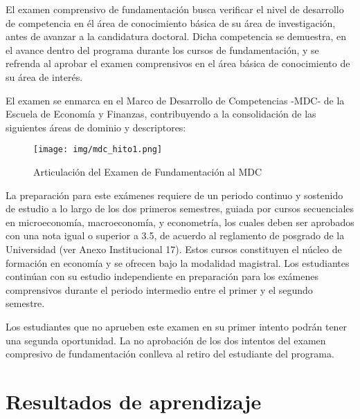 
El examen comprensivo de fundamentación busca verificar el nivel de desarrollo de competencia en él área de conocimiento básica de su área de investigación, antes de avanzar a la candidatura doctoral. Dicha competencia se demuestra, en el avance dentro del programa durante los cursos de fundamentación, y se refrenda al aprobar el examen comprensivos en el área básica de conocimiento de su área de interés.

El examen se enmarca en el Marco de Desarrollo de Competencias -MDC- de la Escuela de Economía y Finanzas, contribuyendo a la consolidación de las siguientes áreas de dominio y descriptores:

\begin{figure}[H]
\caption{Articulación del Examen de Fundamentación al MDC \label{hito1_mdc} }
\begin{center}
\texttt{[image: img/mdc\_hito1.png]}
\end{center}
\end{figure}

La preparación para este exámenes requiere de un periodo continuo y sostenido de estudio a lo largo de los dos primeros semestres, guiada por cursos secuenciales en microeconomía, macroeconomía, y econometría, los cuales deben ser aprobados con una nota igual o superior a 3.5, de acuerdo al reglamento de posgrado de la Universidad (ver Anexo Institucional 17). Estos cursos constituyen el núcleo de formación en economía y se ofrecen bajo la modalidad magistral. Los estudiantes continúan con su estudio independiente en preparación para los exámenes comprensivos durante el periodo intermedio entre el primer y el segundo semestre.  

Los estudiantes que no aprueben este examen en su primer intento podrán tener una segunda oportunidad. La no aprobación de los dos intentos del examen compresivo de fundamentación conlleva al retiro del estudiante del programa. 

\section{Resultados de aprendizaje}

